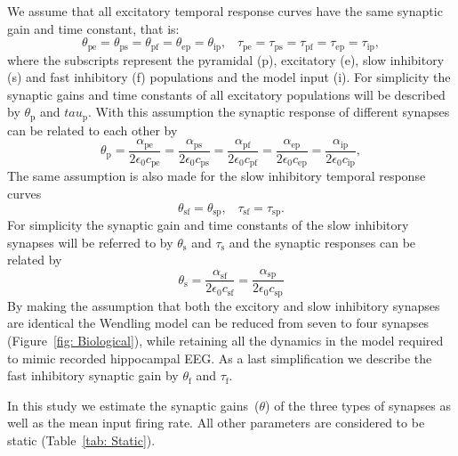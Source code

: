 We assume that all excitatory temporal response curves have the same synaptic gain and time constant, that is:
\begin{equation}\label{eq:ExcSynapse}
    \theta_{\mathrm{pe}} = \theta_{\mathrm{ps}} = \theta_{\mathrm{pf}} = \theta_{\mathrm{ep}} = \theta_{\mathrm{ip}},\,\,\,\,\, \tau_{\mathrm{pe}} = \tau_{\mathrm{ps}} = \tau_{\mathrm{pf}} = \tau_{\mathrm{ep}} = \tau_{\mathrm{ip}},
\end{equation} where the subscripts represent the pyramidal (p), excitatory (e), slow inhibitory (s) and fast inhibitory (f) populations and the model input (i). For simplicity the synaptic gains and time constants of all excitatory populations will be described by $\theta_{\mathrm{p}}$ and $tau_{\mathrm{p}}$. With this assumption the synaptic response of different synapses can be related to each other by
\begin{equation}\label{eq:ExcSynapseResp}
    \theta_{\mathrm{p}} = \frac{\alpha_{\mathrm{pe}}}{2\epsilon_{0}c_{\mathrm{pe}}}=\frac{\alpha_{\mathrm{ps}}}{2\epsilon_{0}c_{\mathrm{ps}}}=\frac{\alpha_{\mathrm{pf}}}{2\epsilon_{0}c_{\mathrm{pf}}}=\frac{\alpha_{\mathrm{ep}}}{2\epsilon_{0}c_{\mathrm{ep}}}=\frac{\alpha_{\mathrm{ip}}}{2\epsilon_{0}c_{\mathrm{ip}}},
\end{equation} 
 The same assumption is also made for the slow inhibitory temporal response curves
		\begin{equation}\label{eq:InhSynapse}
		\theta_{\mathrm{sf}} = \theta_{\mathrm{sp}},\,\,\,\,\, \tau_{\mathrm{sf}} = \tau_{\mathrm{sp}}.
\end{equation} For simplicity the synaptic gain and time constants of the slow inhibitory synapses will be referred to by $\theta_{\mathrm{s}}$ and $\tau_{\mathrm{s}}$ and the synaptic responses can be related by
 \begin{equation}\label{eq:InhSynapseResp}
    \theta_{\mathrm{s}} = \frac{\alpha_{\mathrm{sf}}}{2\epsilon_{0}c_{\mathrm{sf}}}=\frac{\alpha_{\mathrm{sp}}}{2\epsilon_{0}c_{\mathrm{sp}}}
\end{equation} 
By making the assumption that both the excitory and slow inhibitory synapses are identical the Wendling model can be reduced from seven to four synapses (Figure~\ref{fig: Biological}), while retaining all the dynamics in the model required to mimic recorded hippocampal EEG. As a last simplification we describe the fast inhibitory synaptic gain by $\theta_{\mathrm{f}}$ and $\tau_{\mathrm{f}}$. 

In this study we estimate the synaptic gains~($\theta$) of the three types of synapses as well as the mean input firing rate. All other parameters are considered to be static (Table~\ref{tab: Static}).

